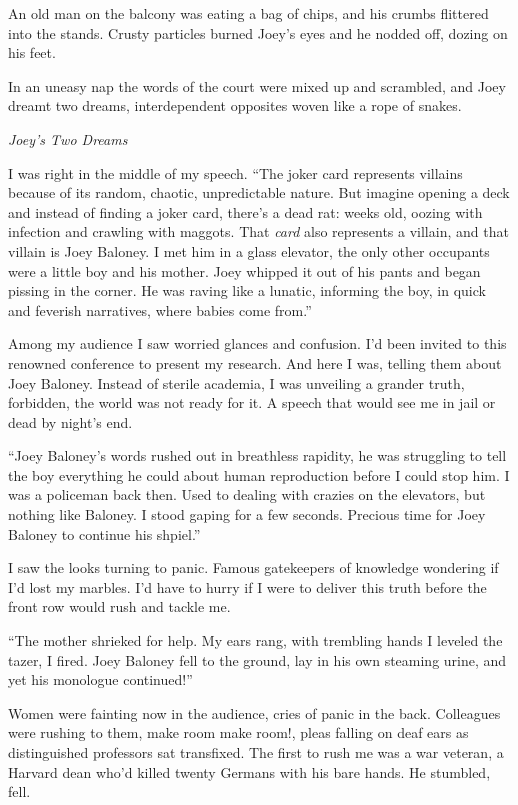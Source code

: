 \documentclass[oneside]{book}
\begin{document}
An old man on the balcony was eating a bag of
chips, and his crumbs flittered into the stands.
Crusty particles burned Joey's eyes and he
nodded off, dozing on his feet.

In an uneasy nap the words of the court were mixed up and
scrambled, and Joey dreamt two dreams, interdependent opposites
woven like a rope of snakes.

\vspace{2mm}
\noindent \textit{Joey's Two Dreams}
\vspace{2mm}

I was right in the middle of my speech.
``The joker card represents villains because of its
random, chaotic, unpredictable nature.  But imagine opening a
deck and instead of finding a joker card, there's a dead rat:
weeks old,
oozing with infection and crawling with maggots.  That \emph{card} also represents a villain,
and that villain is Joey Baloney.
I met him in a glass elevator, the only other occupants were a little boy and his mother.
Joey whipped it out of his pants and began pissing in the corner.  He was raving like a lunatic,
informing the boy, in quick and feverish narratives, where babies come from.''

Among my audience I saw worried glances and confusion.  I'd been invited to this renowned conference
to present my research.  And here I was, telling them about Joey Baloney.
Instead of sterile academia, I was unveiling a grander truth, forbidden,
the world was not ready for it.
A speech that would see me in jail or dead by night's end.

``Joey Baloney's words rushed out in breathless rapidity, he was struggling to tell the
boy everything he could about human reproduction before I could stop him.
I was a policeman back then.  Used to dealing with crazies on the elevators,
but nothing like Baloney.
I stood gaping for a few seconds.  Precious time for Joey Baloney to continue his shpiel.''

I saw the looks turning to panic.  Famous gatekeepers of knowledge wondering if I'd lost my
marbles.  I'd have to hurry if I were to deliver this truth before the front row would
rush and tackle me.

``The mother shrieked for help.  My ears rang, with trembling hands I leveled the tazer, I fired.
Joey Baloney fell to the ground, lay in his own steaming urine, and yet his monologue continued!''

Women were fainting now in the audience, cries of panic in the back.
Colleagues were rushing to them, make room make room!, pleas falling on deaf ears
as distinguished professors sat transfixed.
The first to rush me was a war veteran, a Harvard dean who'd
killed twenty Germans with his bare hands.
He stumbled, fell.
\end{document}
